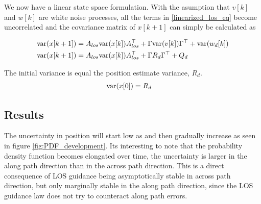 We now have a linear state space formulation. With the asumption that $v[k]$ and $w[k]$ are white noise processes, all the terms in \eqref{linearized_los_eq} become uncorrelated and the covariance matrix of $x[k+1]$ can simply be calculated as

\begin{align}
    \textnormal{var}(x[k+1]) &= A_{los} \textnormal{var}(x[k]) A_{los}^\top + \Gamma \textnormal{var}(v[k]) \Gamma^\top + \textnormal{var}(w_d[k])  \\
    \textnormal{var}(x[k+1]) &= A_{los} \textnormal{var}(x[k]) A_{los}^\top + \Gamma R_d \Gamma^\top + Q_d
\end{align}

The initial variance is equal the position estimate variance, $R_d$. 
\begin{align}
    \textnormal{var}(x[0]) &= R_d
\end{align}

\subsection{Results}





The uncertainty in position will start low as and then gradually increase as seen in figure \ref{fig:PDF_development}. Its interesting to note that the probability density function becomes elongated over time, the uncertainty is larger in the along path direction than in the across path direction. This is a direct consequence of LOS guidance being asymptotically stable in across path direction, but only marginally stable in the along path direction, since the LOS guidance law does not try to counteract along path errors.
